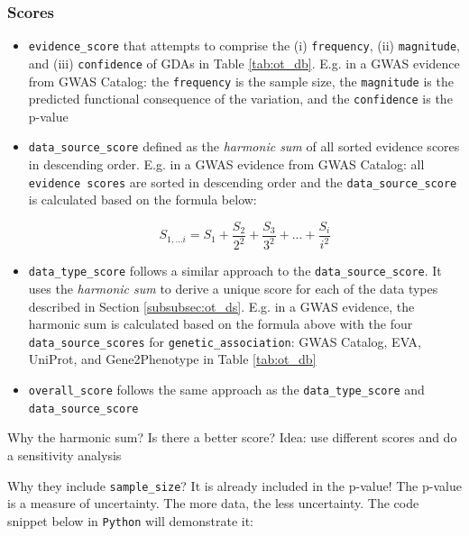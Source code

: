 \subsubsection{Scores}
\label{subsubsec:ot_scores}

\begin{itemize}
    \item \texttt{evidence\_score} that attempts to comprise the (i) \texttt{frequency}, (ii) \texttt{magnitude}, and (iii) \texttt{confidence} of GDAs \cite{koscielny2016} in Table \ref{tab:ot_db}. E.g. in a GWAS evidence from GWAS Catalog: the \texttt{frequency} is the sample size, the \texttt{magnitude} is the predicted functional consequence of the variation, and the \texttt{confidence} is the p-value
    
    \item \texttt{data\_source\_score} defined as the \emph{harmonic sum} of all sorted evidence scores in descending order. E.g. in a GWAS evidence from GWAS Catalog: all \texttt{evidence scores} are sorted in descending order and the \texttt{data\_source\_score} is calculated based on the formula below:
    
    $$ S_{1,...i} = S_1 + \frac{S_2}{2^2} + \frac{S_3}{3^2} + ... + \frac{S_i}{i^2}$$
    
    \item \texttt{data\_type\_score} follows a similar approach to the \texttt{data\_source\_score}. It uses the \emph{harmonic sum} to derive a unique score for each of the data types described in Section \ref{subsubsec:ot_ds}. E.g. in a GWAS evidence, the harmonic sum is calculated based on the formula above with the four \texttt{data\_source\_scores} for \texttt{genetic\_association}: GWAS Catalog, EVA, UniProt, and Gene2Phenotype in Table \ref{tab:ot_db}
    
    
    
    \item \texttt{overall\_score} follows the same approach as the \texttt{data\_type\_score} and \texttt{data\_source\_score}
\end{itemize}

Why the harmonic sum? Is there a better score? Idea: use different scores and do a sensitivity analysis

Why they include \texttt{sample\_size}? It is already included in the p-value! The p-value is a measure of uncertainty. The more data, the less uncertainty. The code snippet below in \texttt{Python} will demonstrate it:



